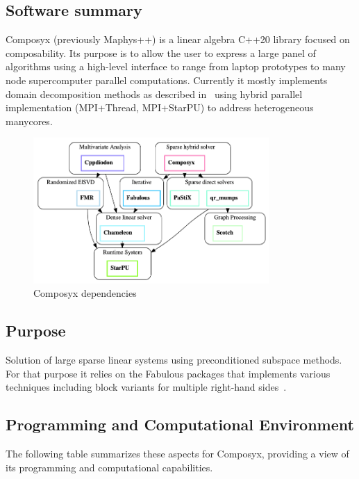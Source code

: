 \subsection{Software summary}
\label{sec:Composyx:summary}
Composyx (previously  Maphys++) is a linear algebra C++20 library focused on composability. Its purpose is to allow the user to express a large panel of algorithms using a high-level interface to range from laptop prototypes to many node supercomputer parallel computations.
Currently it mostly implements domain decomposition methods as described in~\cite{agullo_robust_2019} using hybrid parallel implementation (MPI+Thread, MPI+StarPU) to address heterogeneous manycores.

\begin{figure}
        \centering
        \includegraphics[width=0.8\textwidth]{graphics/composyx/composyx-solverstack.png}
        \caption{Composyx dependencies}
        \label{fig:composyx}
    \end{figure}

\subsection{Purpose}
\label{sec:Composyx:purpose}
Solution of large sparse linear systems using preconditioned subspace methods. For that purpose it relies on the Fabulous packages that implements various techniques including block variants for multiple right-hand sides~\cite{giraud_block_2022}.

\subsection{Programming and Computational Environment}
\label{sec::Composyx:environment_capabilities}


The following table summarizes these aspects for Composyx, providing a  view of its programming and computational capabilities.

